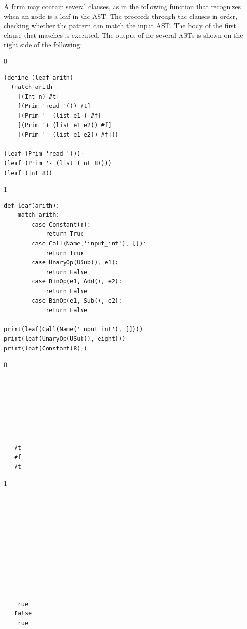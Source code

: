 \documentclass[7x10]{TimesAPriori_MIT}%
\def\racketEd{0}
\def\pythonEd{1}
\def\edition{0}
\numberwithin{theorem}{chapter}
\numberwithin{definition}{chapter}
\numberwithin{equation}{chapter}
\begin{document}
A  form may contain several clauses, as in the following
function  that recognizes when an \LangInt{} node is a leaf in
the AST. The  proceeds through the clauses in order,
checking whether the pattern can match the input AST. The body of the
first clause that matches is executed. The output of  for
several ASTs is shown on the right side of the following:
\begin{center}
\begin{minipage}{0.6\textwidth}
{\if\edition\racketEd
\begin{lstlisting}
(define (leaf arith)
  (match arith
    [(Int n) #t]
    [(Prim 'read '()) #t]
    [(Prim '- (list e1)) #f]
    [(Prim '+ (list e1 e2)) #f]
    [(Prim '- (list e1 e2)) #f]))

(leaf (Prim 'read '()))
(leaf (Prim '- (list (Int 8))))
(leaf (Int 8))
\end{lstlisting}
\fi}
{\if\edition\pythonEd
\begin{lstlisting}
def leaf(arith):
    match arith:
        case Constant(n):
            return True
        case Call(Name('input_int'), []):
            return True
        case UnaryOp(USub(), e1):
            return False
        case BinOp(e1, Add(), e2):
            return False
        case BinOp(e1, Sub(), e2):
            return False

print(leaf(Call(Name('input_int'), [])))
print(leaf(UnaryOp(USub(), eight)))
print(leaf(Constant(8)))
\end{lstlisting}
\fi}
\end{minipage}
\vrule
\begin{minipage}{0.25\textwidth}
{\if\edition\racketEd  
  \begin{lstlisting}






    
   #t
   #f
   #t
\end{lstlisting}
  \fi}
{\if\edition\pythonEd
\begin{lstlisting}






    



    
   True
   False
   True
\end{lstlisting}
\fi}
\end{minipage}
\end{center}
\end{document}
